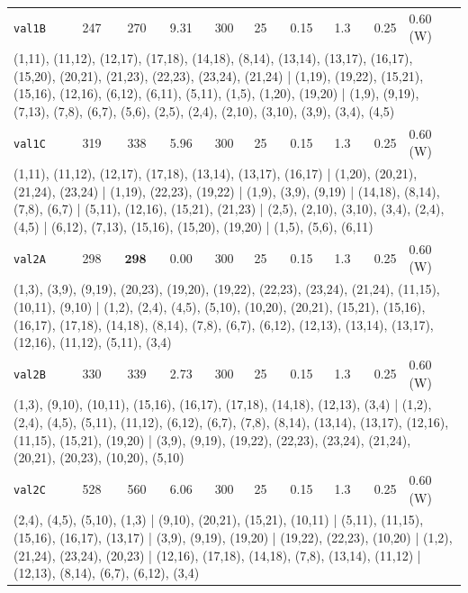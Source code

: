 \begin{longtable}{lrrrrrrrrl}
\texttt{val1B} & 247 & 270 & 9.31 & 300 & 25 & 0.15 & 1.3 & 0.25 & 0.60\,(W) \\
\multicolumn{10}{p{0.96\linewidth}}{\tiny\raggedright\arraybackslash (1,11), (11,12), (12,17), (17,18), (14,18), (8,14), (13,14), (13,17), (16,17), (15,20), (20,21), (21,23), (22,23), (23,24), (21,24) | (1,19), (19,22), (15,21), (15,16), (12,16), (6,12), (6,11), (5,11), (1,5), (1,20), (19,20) | (1,9), (9,19), (7,13), (7,8), (6,7), (5,6), (2,5), (2,4), (2,10), (3,10), (3,9), (3,4), (4,5)} \\[2pt]
\texttt{val1C} & 319 & 338 & 5.96 & 300 & 25 & 0.15 & 1.3 & 0.25 & 0.60\,(W) \\
\multicolumn{10}{p{0.96\linewidth}}{\tiny\raggedright\arraybackslash (1,11), (11,12), (12,17), (17,18), (13,14), (13,17), (16,17) | (1,20), (20,21), (21,24), (23,24) | (1,19), (22,23), (19,22) | (1,9), (3,9), (9,19) | (14,18), (8,14), (7,8), (6,7) | (5,11), (12,16), (15,21), (21,23) | (2,5), (2,10), (3,10), (3,4), (2,4), (4,5) | (6,12), (7,13), (15,16), (15,20), (19,20) | (1,5), (5,6), (6,11)} \\[2pt]
\texttt{val2A} & 298 & $\mathbf{298}$ & 0.00 & 300 & 25 & 0.15 & 1.3 & 0.25 & 0.60\,(W) \\
\multicolumn{10}{p{0.96\linewidth}}{\tiny\raggedright\arraybackslash (1,3), (3,9), (9,19), (20,23), (19,20), (19,22), (22,23), (23,24), (21,24), (11,15), (10,11), (9,10) | (1,2), (2,4), (4,5), (5,10), (10,20), (20,21), (15,21), (15,16), (16,17), (17,18), (14,18), (8,14), (7,8), (6,7), (6,12), (12,13), (13,14), (13,17), (12,16), (11,12), (5,11), (3,4)} \\[2pt]
\texttt{val2B} & 330 & 339 & 2.73 & 300 & 25 & 0.15 & 1.3 & 0.25 & 0.60\,(W) \\
\multicolumn{10}{p{0.96\linewidth}}{\tiny\raggedright\arraybackslash (1,3), (9,10), (10,11), (15,16), (16,17), (17,18), (14,18), (12,13), (3,4) | (1,2), (2,4), (4,5), (5,11), (11,12), (6,12), (6,7), (7,8), (8,14), (13,14), (13,17), (12,16), (11,15), (15,21), (19,20) | (3,9), (9,19), (19,22), (22,23), (23,24), (21,24), (20,21), (20,23), (10,20), (5,10)} \\[2pt]
\texttt{val2C} & 528 & 560 & 6.06 & 300 & 25 & 0.15 & 1.3 & 0.25 & 0.60\,(W) \\
\multicolumn{10}{p{0.96\linewidth}}{\tiny\raggedright\arraybackslash (2,4), (4,5), (5,10), (1,3) | (9,10), (20,21), (15,21), (10,11) | (5,11), (11,15), (15,16), (16,17), (13,17) | (3,9), (9,19), (19,20) | (19,22), (22,23), (10,20) | (1,2), (21,24), (23,24), (20,23) | (12,16), (17,18), (14,18), (7,8), (13,14), (11,12) | (12,13), (8,14), (6,7), (6,12), (3,4)} \\[2pt]

\end{longtable}
